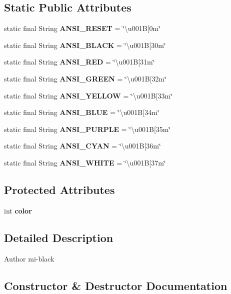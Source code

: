 \subsection*{Static Public Attributes}
\begin{DoxyCompactItemize}
\item 
static final String {\bf A\-N\-S\-I\-\_\-\-R\-E\-S\-E\-T} = \char`\"{}\textbackslash{}u001\-B[0m\char`\"{}
\item 
static final String {\bf A\-N\-S\-I\-\_\-\-B\-L\-A\-C\-K} = \char`\"{}\textbackslash{}u001\-B[30m\char`\"{}
\item 
static final String {\bf A\-N\-S\-I\-\_\-\-R\-E\-D} = \char`\"{}\textbackslash{}u001\-B[31m\char`\"{}
\item 
static final String {\bf A\-N\-S\-I\-\_\-\-G\-R\-E\-E\-N} = \char`\"{}\textbackslash{}u001\-B[32m\char`\"{}
\item 
static final String {\bf A\-N\-S\-I\-\_\-\-Y\-E\-L\-L\-O\-W} = \char`\"{}\textbackslash{}u001\-B[33m\char`\"{}
\item 
static final String {\bf A\-N\-S\-I\-\_\-\-B\-L\-U\-E} = \char`\"{}\textbackslash{}u001\-B[34m\char`\"{}
\item 
static final String {\bf A\-N\-S\-I\-\_\-\-P\-U\-R\-P\-L\-E} = \char`\"{}\textbackslash{}u001\-B[35m\char`\"{}
\item 
static final String {\bf A\-N\-S\-I\-\_\-\-C\-Y\-A\-N} = \char`\"{}\textbackslash{}u001\-B[36m\char`\"{}
\item 
static final String {\bf A\-N\-S\-I\-\_\-\-W\-H\-I\-T\-E} = \char`\"{}\textbackslash{}u001\-B[37m\char`\"{}
\end{DoxyCompactItemize}
\subsection*{Protected Attributes}
\begin{DoxyCompactItemize}
\item 
int {\bf color}
\end{DoxyCompactItemize}


\subsection{Detailed Description}
\begin{DoxyAuthor}{Author}
mi-\/black 
\end{DoxyAuthor}


\subsection{Constructor \& Destructor Documentation}
